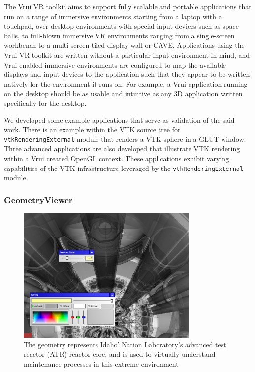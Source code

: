 The Vrui VR toolkit aims to support fully scalable and portable applications that run on a range of immersive environments starting from a laptop with a touchpad, over desktop environments with special input devices such as space balls, to full-blown immersive VR environments ranging from a single-screen workbench to a multi-screen tiled display wall or CAVE. Applications using the Vrui VR toolkit are written without a particular input environment in mind, and Vrui-enabled immersive environments are configured to map the available displays and input devices to the application such that they appear to be written natively for the environment it runs on. For example, a Vrui application running on the desktop should be as usable and intuitive as any 3D application written specifically for the desktop.

We developed some example applications that serve as validation of the said work. There is an example within the VTK source tree for \texttt{vtkRenderingExternal} module that renders a VTK sphere in a GLUT window. Three advanced applications are also developed that illustrate VTK rendering within a Vrui created OpenGL context. These applications exhibit varying capabilities of the VTK infrastructure leveraged by the \texttt{vtkRenderingExternal} module. 

\subsubsection{GeometryViewer}

\begin{figure}[h!]
 \centering
 \includegraphics[width=3.5in]{images/vessel.png}
 \caption{The geometry represents Idaho' Nation Laboratory's advanced test reactor (ATR) reactor core, and is used to virtually understand maintenance processes in this extreme environment}
 \label{fig:vessel}
\end{figure}


